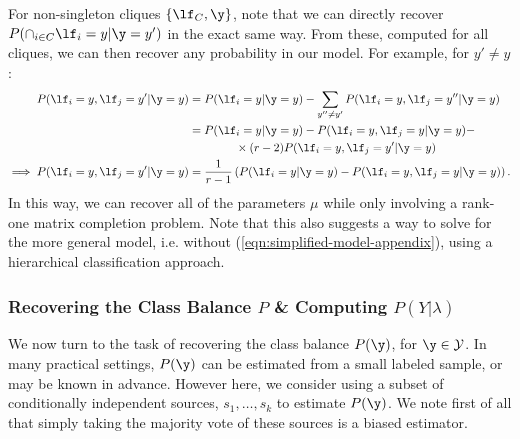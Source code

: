 \documentclass[letterpaper]{article}
\begin{document}
\begin{appendix}
For non-singleton cliques $\{ \lf_C, \y \}$, note that we can directly recover $P(\cap_{i \in C} \lf_i=y|\y = y')$ in the exact same way.
From these, computed for all cliques, we can then recover any probability in our model.
For example, for $y' \neq y$:
\begin{align*}
	P(\lf_i=y, \lf_j=y' | \y=y)
	&=
	P(\lf_i=y | \y=y) - \sum_{y''\neq y'} P(\lf_i=y, \lf_j=y'' | \y=y)\\
	&=
	P(\lf_i=y | \y=y) - P(\lf_i=y, \lf_j=y | \y=y) - \\
&\qquad \qquad \times (r-2) P(\lf_i=y, \lf_j=y' | \y=y)\\
	\implies
	P(\lf_i=y, \lf_j=y' | \y=y)
	&=
	\frac{1}{r-1} \left(
		P(\lf_i=y | \y=y) - P(\lf_i=y, \lf_j=y | \y=y)
	\right).
\end{align*}
In this way, we can recover all of the parameters $\mu$ while only involving a rank-one matrix completion problem.
Note that this also suggests a way to solve for the more general model, i.e. without (\ref{eqn:simplified-model-appendix}), using a hierarchical classification approach.



\subsubsection{Recovering the Class Balance $P$ \& Computing $P(Y|\lambda)$}
\label{appendix:recovering-class-balance}
We now turn to the task of recovering the class balance $P(\y)$, for $\y \in \mathcal{Y}$.
In many practical settings, $P(\y)$ can be estimated from a small labeled sample, or may be known in advance.
However here, we consider using a subset of conditionally independent sources, $s_1, \ldots, s_k$ to estimate $P(\y)$.
We note first of all that simply taking the majority vote of these sources is a biased estimator.


\end{appendix}
\end{document}
